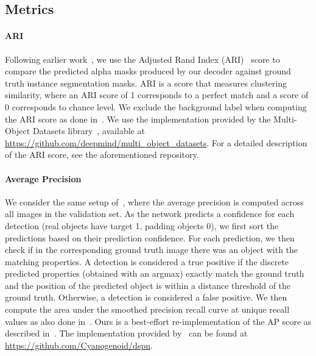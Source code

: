 \documentclass{article}
\begin{document}
\subsection{Metrics}
\paragraph{ARI}
Following earlier work~\citep{greff2019multi}, we use the Adjusted Rand Index (ARI)~\citep{rand1971objective,hubert1985comparing} score to compare the predicted alpha masks produced by our decoder against ground truth instance segmentation masks. ARI is a score that measures clustering similarity, where an ARI score of 1 corresponds to a perfect match and a score of 0 corresponds to chance level. We exclude the background label when computing the ARI score as done in~\citep{greff2019multi}. We use the implementation provided by the Multi-Object Datasets library~\citep{multiobjectdatasets19}, available at \url{https://github.com/deepmind/multi_object_datasets}. For a detailed description of the ARI score, see the aforementioned repository.

\paragraph{Average Precision} We consider the same setup of~\citet{zhang2019deep}, where the average precision is computed across all images in the validation set. As the network predicts a confidence for each detection (real objects have target 1, padding objects 0), we first sort the predictions based on their prediction confidence. For each prediction, we then check if in the corresponding ground truth image there was an object with the matching properties. A detection is considered a true positive if the discrete predicted properties (obtained with an argmax) exactly match the ground truth and the position of the predicted object is within a distance threshold of the ground truth. Otherwise, a detection is considered a false positive. We then compute the area under the smoothed precision recall curve at unique recall values as also done in~\citep{everingham2015pascal}. Ours is a best-effort re-implementation of the AP score as described in~\citep{zhang2019deep}. The implementation provided by~\citep{zhang2019deep} can be found at \url{https://github.com/Cyanogenoid/dspn}.
\end{document}
